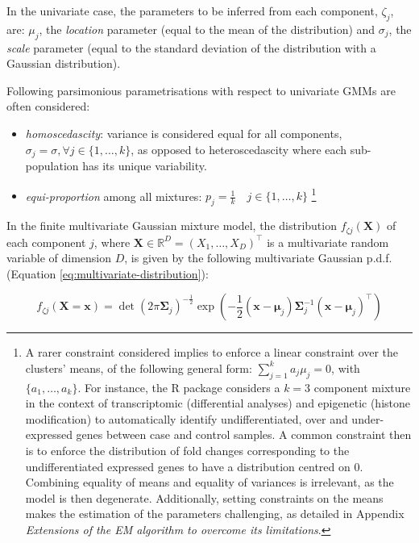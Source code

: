 In the univariate case, the parameters to be inferred from each
component, \(\zeta_j\), are: \(\mu_j\), the \emph{location} parameter (equal to
the mean of the distribution) and \(\sigma_j\), the \emph{scale} parameter
(equal to the standard deviation of the distribution with a Gaussian distribution).

Following parsimonious parametrisations with respect to univariate GMMs
are often considered:

\begin{itemize}
\item
  \emph{homoscedascity}: variance is considered equal for all components,
  \(\sigma_j = \sigma, \forall j \in \{1, \ldots, k \}\), as opposed to
  heteroscedascity where each sub-population has its unique
  variability.
\item
  \emph{equi-proportion} among all mixtures:
  \(p_j = \frac{1}{k} \quad j \in \{ 1, \ldots, k\}\) \footnote{A rarer constraint considered implies to enforce a linear
    constraint over the clusters' means, of the following general form:
    \(\sum_{j=1}^k a_j \mu_j=0\), with \(\{a_1, \ldots, a_k\}\). For
    instance, the R package  considers a \(k=3\) component
    mixture in the context of transcriptomic (differential analyses) and
    epigenetic (histone modification) to automatically identify
    undifferentiated, over and under-expressed genes between case and
    control samples. A common constraint then is to enforce the
    distribution of fold changes corresponding to the undifferentiated
    expressed genes to have a distribution centred on 0. Combining
    equality of means and equality of variances is irrelevant, as the
    model is then degenerate. Additionally, setting constraints on the
    means makes the estimation of the parameters challenging, as
    detailed in Appendix \emph{Extensions of the EM algorithm to overcome its limitations}.}
\end{itemize}

In the finite multivariate Gaussian mixture model, the distribution \(f_{\zeta j}(\boldsymbol{X})\) of each component \(j\), where
\(\boldsymbol{X} \in \mathbb{R}^D =(X_1, \ldots, X_D)^\top\) is a multivariate random variable
of dimension \(D\), is given by the
following multivariate Gaussian p.d.f.
(Equation \eqref{eq:multivariate-distribution}):

\begin{equation}
    f_{\zeta j}(\boldsymbol{X}=\boldsymbol{x})=\operatorname{det}(2\pi\boldsymbol{\Sigma}_j)^{-\frac{1}{2}} \exp\left( -\frac{1}{2} (\boldsymbol{x} - \boldsymbol{\mu}_j) \boldsymbol{\Sigma}_j^{-1} (\boldsymbol{x} - \boldsymbol{\mu}_j)^\top\right)
\label{eq:multivariate-distribution}
\end{equation}

